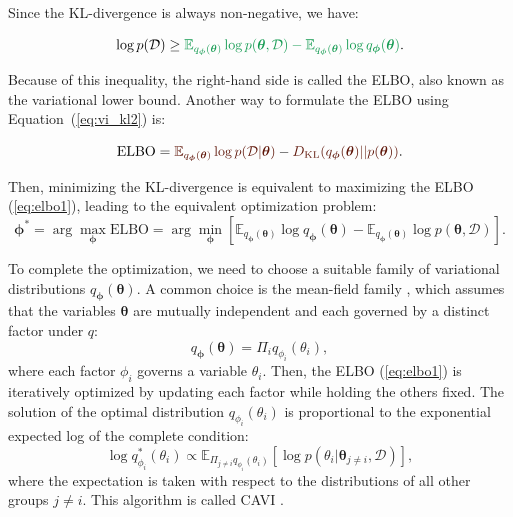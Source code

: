 Since the \ac{KL}-divergence is always non-negative, we have:
\begin{mdframed}[nobreak=true]
    \begin{equation}
        \label{eq:elbo1}
        \log p(\mathcal{D}) \geq \textcolor{ForestGreen}{\mathbb{E}_{q_{\boldsymbol{\phi}}(\boldsymbol{\theta})}\log p(\boldsymbol{\theta}, \mathcal{D})-\mathbb{E}_{q_{\boldsymbol{\phi}}(\boldsymbol{\theta})}\log q_{\boldsymbol{\phi}}(\boldsymbol{\theta})}.
    \end{equation}
\end{mdframed}
Because of this inequality, the right-hand side is called the \acf{ELBO}, also known as the variational lower bound. Another way to formulate the \ac{ELBO} using Equation~(\ref{eq:vi_kl2}) is:
\begin{mdframed}[nobreak=true]
    \begin{equation}
        \label{eq:elbo2}
        \text{ELBO} = \textcolor{Sepia}{\mathbb{E}_{q_{\boldsymbol{\phi}}(\boldsymbol{\theta})}\log p(\mathcal{D}|\boldsymbol{\theta})} - \textcolor{Sepia}{D_{\text{KL}}(q_{\boldsymbol{\phi}}(\boldsymbol{\theta})||p(\boldsymbol{\theta}))}. 
    \end{equation}
\end{mdframed}
Then, minimizing the \ac{KL}-divergence is equivalent to maximizing the \ac{ELBO} (\ref{eq:elbo1}), leading to the equivalent optimization problem:
\begin{equation}
    \label{eq:vi_opt}
    \boldsymbol{\phi}^* = \arg\max_{\boldsymbol{\phi}} \text{ELBO} = \arg\min_{\boldsymbol{\phi}}[\mathbb{E}_{q_{\boldsymbol{\phi}}(\boldsymbol{\theta})}\log q_{\boldsymbol{\phi}}(\boldsymbol{\theta})-\mathbb{E}_{q_{\boldsymbol{\phi}}(\boldsymbol{\theta})}\log p(\boldsymbol{\theta}, \mathcal{D})].
\end{equation}

To complete the optimization, we need to choose a suitable family of variational distributions $q_{\boldsymbol{\phi}}(\boldsymbol{\theta})$. A common choice is the mean-field family \citep{bishop2006}, which assumes that the variables $\boldsymbol{\theta}$ are mutually independent and each governed by a distinct factor under $q$:
\begin{equation}
    q_{\boldsymbol{\phi}}(\boldsymbol{\theta}) = \Pi_{i} q_{\phi_i}(\theta_i),
\end{equation}
where each factor $\phi_i$ governs a variable $\theta_i$. Then, the \ac{ELBO} (\ref{eq:elbo1}) is iteratively optimized by updating each factor while holding the others fixed. The solution of the optimal distribution $q_{\phi_i}(\theta_i)$ is proportional to the exponential expected log of the complete condition:
\begin{equation}
    \log q_{\phi_i}^*(\theta_i) \propto \mathbb{E}_{\Pi_{j\neq i}q_{\phi_i}(\theta_i)}[\log p(\theta_i|\boldsymbol{\theta}_{j\neq i}, \mathcal{D})],
\end{equation}
where the expectation is taken with respect to the distributions of all other groups $j \neq i$. This algorithm is called \ac{CAVI} \citep{bishop2006}. 

